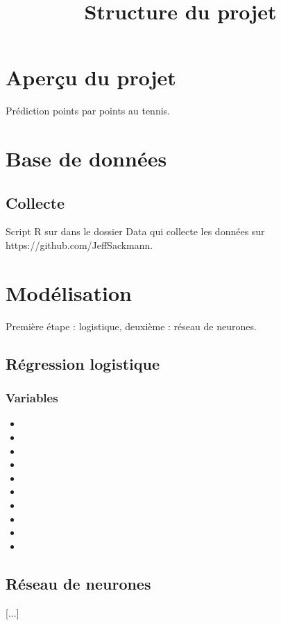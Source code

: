 \documentclass[12pt]{article}
\begin{document}

\title{\bf Structure du projet}

\maketitle


\section*{Aperçu du projet}
Prédiction points par points au tennis.


\newpage
\tableofcontents

\newpage
\section{Base de données}
\subsection{Collecte}
Script R sur dans le dossier Data qui collecte les données sur https://github.com/JeffSackmann.

\section{Modélisation}
Première étape : logistique, deuxième : réseau de neurones.


\subsection{Régression logistique}

\subsubsection*{Variables}

\begin{itemize}
	\item 
	\item
	\item
	\item
	\item
	\item
	\item
	\item
	\item
	\item
\end{itemize}



\subsection{Réseau de neurones}

[...]




%
%
\end{document}
